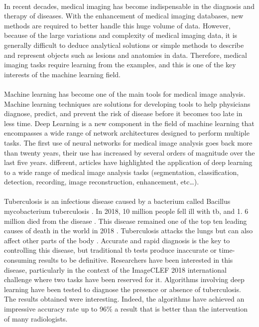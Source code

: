 \paragraph{}
In recent decades, medical imaging has become indispensable in the diagnosis and therapy of diseases. With the enhancement of medical imaging databases, new methods are required to better handle this huge volume of data. However, because of the large variations and complexity of medical imaging data, it is generally difficult to deduce analytical solutions or simple methods to describe and represent objects such as lesions and anatomies in data. Therefore, medical imaging tasks require learning from the examples, and this is one of the key interests of the machine learning field.
\paragraph{}
Machine learning has become one of the main tools for medical image analysis. Machine learning techniques are solutions for developing tools to help physicians diagnose, predict, and prevent the risk of disease before it becomes too late in less time. Deep Learning is a new component in the field of machine learning that encompasses a wide range of network architectures designed to perform multiple tasks. The first use of neural networks for medical image analysis goes back more than twenty years, their use has increased by several orders of magnitude over the last five years. different, articles \cite{NNMEEX:1, NNMEEX:2, NNMEEX:3, NNMEEX:4, NNMEEX:5} have highlighted the application of deep learning to a wide range of medical image analysis tasks (segmentation, classification, detection, recording, image reconstruction, enhancement, etc\dots).
\paragraph{}
Tuberculosis is an infectious disease caused by a bacterium called Bacillus mycobacterium tuberculosis \cite{TBT:1}. In 2018, 10 million people fell ill with \ac{tb}, and 1. 6 million died from the disease \cite{TBT:1}. This disease remained one of the top ten leading causes of death in the world in 2018 \cite{TBT:1}. Tuberculosis attacks the lungs but can also affect other parts of the body \cite{TBT:2}. Accurate and rapid diagnosis is the key to controlling this disease, but traditional \ac{tb} tests produce inaccurate or time-consuming results to be definitive. Researchers have been interested in this disease, particularly in the context of the ImageCLEF 2018\cite{ImageCLEF:1} international challenge \cite{ImageCLEF:1} where two tasks have been reserved for it. Algorithms involving deep learning have been tested to diagnose the presence or absence of tuberculosis. The results obtained were interesting. Indeed, the algorithms have achieved an impressive accuracy rate up to 96\% \cite{NNMEEX:6, NNMEEX:7} a result that is better than the intervention of many radiologists.

